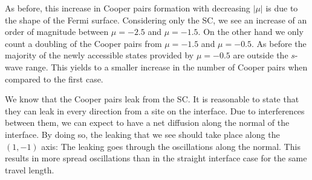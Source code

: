 \documentclass[..\main.tex]{subfile}
\begin{document}
As before, this increase in Cooper pairs formation with decreasing $|\mu|$ is due to the shape of the Fermi surface.
Considering only the SC, we see an increase of an order of magnitude between $\mu=-2.5$ and $\mu=-1.5$. On the other hand we only count
a doubling of the Cooper pairs from $\mu=-1.5$ and $\mu=-0.5$.
As before the majority of the newly accessible states provided by $\mu=-0.5$ are outside the $s$-wave range.
This yields to a smaller increase in the number of Cooper pairs when compared to the first case.


We know that the Cooper pairs leak from the SC. It is reasonable to state that they can leak in every direction from a site on the interface.
Due to interferences between them, we can expect to have a net diffusion along the normal of the interface. By doing so, the leaking that we see
should take place along the $(1,-1)$ axis: The leaking goes through the oscillations along the normal. This results in more spread
oscillations than in the straight interface case for the same travel length.
\end{document}
